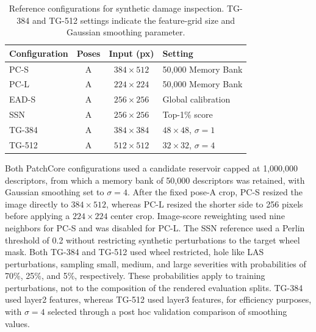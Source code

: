 \begin{table}[ht!]
    \centering
    \small
    \setlength{\tabcolsep}{4pt}
    \begin{tabular}{@{}l c c l@{}}
        \toprule
        \textbf{Configuration} & \textbf{Poses} & \textbf{Input (px)} & \textbf{Setting}             \\
        \midrule
        \midrule
        PC-S                   & A              & \(384\times512\)    & 50,000 Memory Bank           \\
        PC-L                   & A              & \(224\times224\)    & 50,000 Memory Bank           \\
        EAD-S                  & A              & \(256\times256\)    & Global calibration           \\
        SSN                    & A              & \(256\times256\)    & Top-1\% score                \\
        TG-384                 & A              & \(384\times384\)    & \(48\times48\), \(\sigma=1\) \\
        TG-512                 & A              & \(512\times512\)    & \(32\times32\), \(\sigma=4\) \\
        \bottomrule
    \end{tabular}
    \vspace{5mm}
    \caption{Reference configurations for synthetic damage inspection. TG-384 and TG-512 settings indicate the feature-grid size and Gaussian smoothing parameter.}
    \label{tab:damage-reference-configurations}
\end{table}

Both PatchCore configurations used a candidate reservoir capped at 1,000,000 descriptors, from which a memory bank of 50,000 descriptors was retained, with Gaussian smoothing set to \(\sigma=4\). After the fixed pose-A crop, PC-S resized the image directly to \(384\times512\), whereas PC-L resized the shorter side to 256 pixels before applying a \(224\times224\) center crop. Image-score reweighting used nine neighbors for PC-S and was disabled for PC-L. The SSN reference used a Perlin threshold of 0.2 without restricting synthetic perturbations to the target wheel mask. Both TG-384 and TG-512 used wheel restricted, hole like LAS perturbations, sampling small, medium, and large severities with probabilities of 70\%, 25\%, and 5\%, respectively. These probabilities apply to training perturbations, not to the composition of the rendered evaluation splits. TG-384 used layer2 features, whereas TG-512 used layer3 features, for efficiency purposes, with \(\sigma=4\) selected through a post hoc validation comparison of smoothing values.

